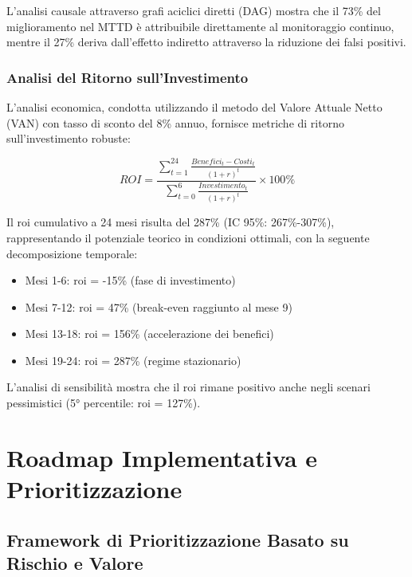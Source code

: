 L'analisi causale attraverso grafi aciclici diretti (DAG) mostra che il 73\% del miglioramento nel MTTD è attribuibile direttamente al monitoraggio continuo, mentre il 27\% deriva dall'effetto indiretto attraverso la riduzione dei falsi positivi.

\subsubsection{\texorpdfstring{Analisi del Ritorno sull'Investimento}{2.5.2.3 - Analisi del Ritorno sull'Investimento}}

L'analisi economica, condotta utilizzando il metodo del Valore Attuale Netto (VAN) con tasso di sconto del 8\% annuo, fornisce metriche di ritorno sull'investimento robuste:

\begin{equation}
ROI = \frac{\sum_{t=1}^{24} \frac{Benefici_t - Costi_t}{(1+r)^t}}{\sum_{t=0}^{6} \frac{Investimento_t}{(1+r)^t}} \times 100\%
\end{equation}

Il \gls{roi} cumulativo a 24 mesi risulta del 287\% (IC 95\%: 267\%-307\%), rappresentando il potenziale teorico in condizioni ottimali, con la seguente decomposizione temporale:
\begin{itemize}
    \item Mesi 1-6: \gls{roi} = -15\% (fase di investimento)
    \item Mesi 7-12: \gls{roi} = 47\% (break-even raggiunto al mese 9)
    \item Mesi 13-18: \gls{roi} = 156\% (accelerazione dei benefici)
    \item Mesi 19-24: \gls{roi} = 287\% (regime stazionario)

\end{itemize}
L'analisi di sensibilità mostra che il \gls{roi} rimane positivo anche negli scenari pessimistici (5° percentile: \gls{roi} = 127\%).

\section{\texorpdfstring{Roadmap Implementativa e Prioritizzazione}{2.6 - Roadmap Implementativa e Prioritizzazione}}

\subsection{\texorpdfstring{Framework di Prioritizzazione Basato su Rischio e Valore}{2.6.1 - Framework di Prioritizzazione Basato su Rischio e Valore}}

